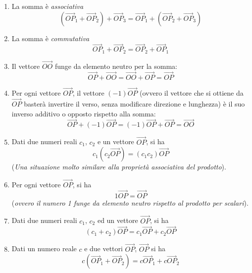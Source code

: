 \begin{enumerate}
\item La somma è \textit{associativa}
  \begin{equation}
    \label{eq:sommaassociativa}
    (\vec{OP}_1+\vec{OP}_2)+\vec{OP}_3=\vec{OP}_1+(\vec{OP}_2+\vec{OP}_3)
  \end{equation}
\item La somma è \textit{commutativa}
  \begin{equation}
    \label{eq:commutativa}
    \vec{OP}_1+\vec{OP}_2=\vec{OP}_2+\vec{OP}_1
  \end{equation}
\item Il vettore $\vec{OO}$ funge da elemento neutro per la somma:
  \begin{equation}
    \label{eq:sommaelementoneutro}
    \vec{OP}+\vec{OO}=\vec{OO}+\vec{OP}=\vec{OP}
  \end{equation}
\item Per ogni vettore $\vec{OP}$, il vettore $(-1)\vec{OP}$ (ovvero il vettore che si ottiene da $\vec{OP}$ basterà invertire il verso, senza modificare direzione e lunghezza) è il suo inverso additivo o opposto rispetto alla somma:
  \begin{equation}
    \label{eq:sommainversa}
    \vec{OP}+(-1)\vec{OP}=(-1)\vec{OP}+\vec{OP}=\vec{OO}
  \end{equation}
\item Dati due numeri reali $c_1$, $c_2$ e un vettore $\vec{OP}$, si ha
  \begin{equation}
    \label{eq:prodottoconduenumerireali}
    c_1(c_2\vec{OP})=(c_1c_2)\vec{OP}
  \end{equation}
  (\textit{Una situazione molto similare alla proprietà associativa del prodotto}).
\item Per ogni vettore $\vec{OP}$, si ha
  \begin{equation}
    \label{eq:perognivecOP}
    1\vec{OP}=\vec{OP}
  \end{equation}
  (\textit{ovvero il numero 1 funge da elemento neutro rispetto al prodotto per scalari}).
\item Dati due numeri reali $c_1$, $c_2$ ed un vettore $\vec{OP}$, si ha
  \begin{equation}
    \label{eq:numrealeVectOP}
    (c_1+c_2)\vec{OP}=c_1\vec{OP}+c_2\vec{OP}
  \end{equation}
\item Dati un numero reale $c$ e due vettori $\vec{OP}$, $\vec{OP}$ si ha
  \begin{equation}
    \label{eq:prodottoconduenumerirealiperunnumeroreale}
    c(\vec{OP}_1+\vec{OP}_2)=c\vec{OP}_1+c\vec{OP}_2
  \end{equation}
\end{enumerate}
